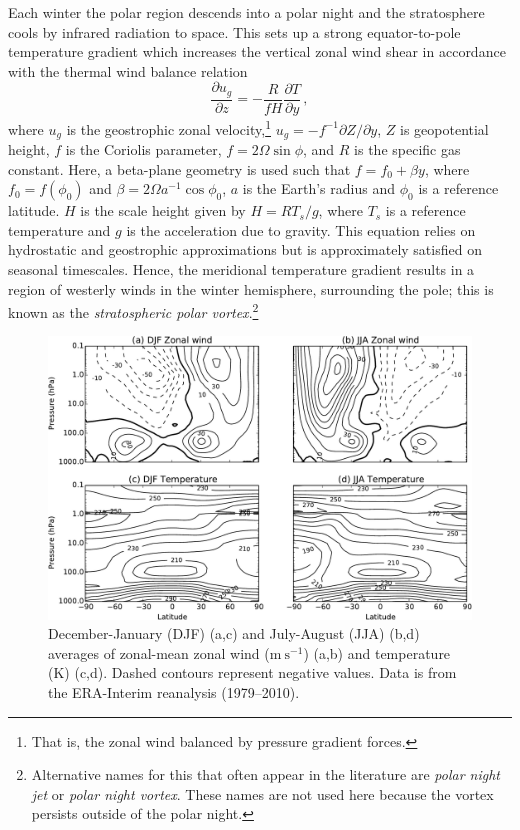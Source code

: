 Each winter the polar region descends into a polar night and the stratosphere
cools by infrared radiation to space. This sets up a strong equator-to-pole
temperature gradient which increases the vertical zonal wind shear in accordance
with the thermal wind balance relation
\begin{equation}
\frac{\partial u_g}{\partial z} = -\frac{R}{fH}\frac{\partial T}{\partial y} \,, 
\end{equation} 
where $u_g$ is the geostrophic zonal velocity,\footnote{That is, the zonal wind
  balanced by pressure gradient forces.} $u_g = -f^{-1}\partial Z/\partial y$,
$Z$ is geopotential height, $f$ is the Coriolis parameter, $f=2\Omega\sin\phi$,
and $R$ is the specific gas constant. Here, a beta-plane geometry is used such
that $f=f_0+\beta y$, where $f_0=f(\phi_0)$ and
$\beta = 2\Omega a^{-1}\cos\phi_0$, $a$ is the Earth's radius and $\phi_{0}$ is
a reference latitude. $H$ is the scale height given by $H = RT_s/g$, where $T_s$
is a reference temperature and $g$ is the acceleration due to gravity. This
equation relies on hydrostatic and geostrophic approximations but is
approximately satisfied on seasonal timescales. Hence, the meridional
temperature gradient results in a region of westerly winds in the winter
hemisphere, surrounding the pole; this is known as the \emph{stratospheric polar
  vortex}.\footnote{Alternative names for this that often appear in the
  literature are \emph{polar night jet} or \emph{polar night vortex}. These
  names are not used here because the vortex persists outside of the polar
  night.}

\begin{figure}
 \centering
 \noindent\includegraphics[width=\textwidth]{figures/chapter-intro/zmzw_zmT_clim.pdf}
 \caption[Zonal-mean zonal wind and temperature climatology]{December-January
   (DJF) (a,c) and July-August (JJA) (b,d) averages of zonal-mean zonal wind
   ($\mathrm{m~s^{-1}}$) (a,b) and temperature (K) (c,d). Dashed contours
   represent negative values. Data is from the ERA-Interim reanalysis
   (1979--2010).}
 \label{fig:zmzw_zmT_clim}
\end{figure}

